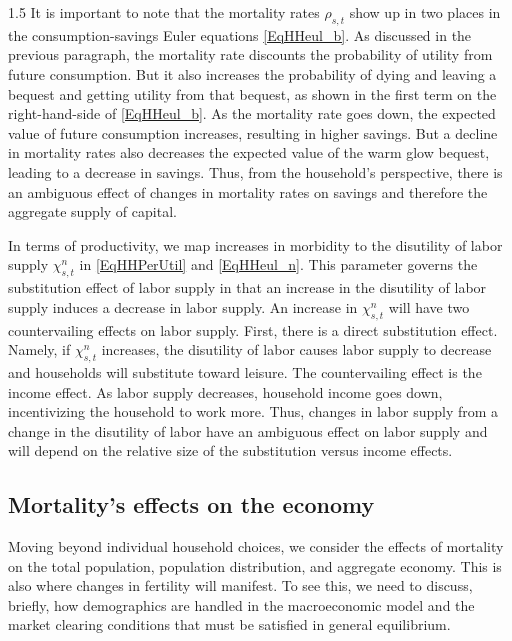 \documentclass[letterpaper,12pt]{article}
\theoremstyle{definition}
\begin{document}
\begin{spacing}{1.5}
    It is important to note that the mortality rates $\rho_{s,t}$ show up in two places in the consumption-savings Euler equations \eqref{EqHHeul_b}. As discussed in the previous paragraph, the mortality rate discounts the probability of utility from future consumption. But it also increases the probability of dying and leaving a bequest and getting utility from that bequest, as shown in the first term on the right-hand-side of \eqref{EqHHeul_b}. As the mortality rate goes down, the expected value of future consumption increases, resulting in higher savings. But a decline in mortality rates also decreases the expected value of the warm glow bequest, leading to a decrease in savings. Thus, from the household's perspective, there is an ambiguous effect of changes in mortality rates on savings and therefore the aggregate supply of capital.

    In terms of productivity, we map increases in morbidity to the disutility of labor supply $\chi^n_{s,t}$ in \eqref{EqHHPerUtil} and \eqref{EqHHeul_n}. This parameter governs the substitution effect of labor supply in that an increase in the disutility of labor supply induces a decrease in labor supply. An increase in $\chi^n_{s,t}$ will have two countervailing effects on labor supply. First, there is a direct substitution effect. Namely, if $\chi^n_{s,t}$ increases, the disutility of labor causes labor supply to decrease and households will substitute toward leisure. The countervailing effect is the income effect. As labor supply decreases, household income goes down, incentivizing the household to work more. Thus, changes in labor supply from a change in the disutility of labor have an ambiguous effect on labor supply and will depend on the relative size of the substitution versus income effects.


    \subsection{Mortality's effects on the economy}

    Moving beyond individual household choices, we consider the effects of mortality on the total population, population distribution, and aggregate economy. This is also where changes in fertility will manifest. To see this, we need to discuss, briefly, how demographics are handled in the macroeconomic model and the market clearing conditions that must be satisfied in general equilibrium.


\end{spacing}
\end{document}
